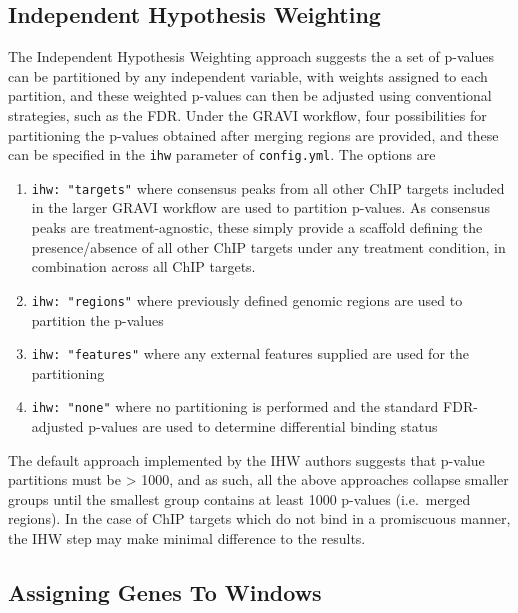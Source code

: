 \documentclass[
]{book}
\providecommand{\tightlist}{%
  \setlength{\itemsep}{0pt}\setlength{\parskip}{0pt}}
\begin{document}
\hypertarget{independent-hypothesis-weighting}{%
\subsection*{Independent Hypothesis Weighting}\label{independent-hypothesis-weighting}}

The Independent Hypothesis Weighting approach\citep{ihw} suggests the a set of p-values can be partitioned by any independent variable, with weights assigned to each partition, and these weighted p-values can then be adjusted using conventional strategies, such as the FDR.
Under the GRAVI workflow, four possibilities for partitioning the p-values obtained after merging regions are provided, and these can be specified in the \texttt{ihw} parameter of \texttt{config.yml}.
The options are

\begin{enumerate}
\def\labelenumi{\arabic{enumi}.}
\tightlist
\item
  \texttt{ihw:\ "targets"} where consensus peaks from all other ChIP targets included in the larger GRAVI workflow are used to partition p-values. As consensus peaks are treatment-agnostic, these simply provide a scaffold defining the presence/absence of all other ChIP targets under any treatment condition, in combination across all ChIP targets.
\item
  \texttt{ihw:\ "regions"} where previously defined genomic regions are used to partition the p-values
\item
  \texttt{ihw:\ "features"} where any external features supplied are used for the partitioning
\item
  \texttt{ihw:\ "none"} where no partitioning is performed and the standard FDR-adjusted p-values are used to determine differential binding status
\end{enumerate}

The default approach implemented by the IHW authors suggests that p-value partitions must be \textgreater{} 1000, and as such, all the above approaches collapse smaller groups until the smallest group contains at least 1000 p-values (i.e.~merged regions).
In the case of ChIP targets which do not bind in a promiscuous manner, the IHW step may make minimal difference to the results.

\hypertarget{assigning-genes-to-windows}{%
\subsection*{Assigning Genes To Windows}\label{assigning-genes-to-windows}}
\end{document}
